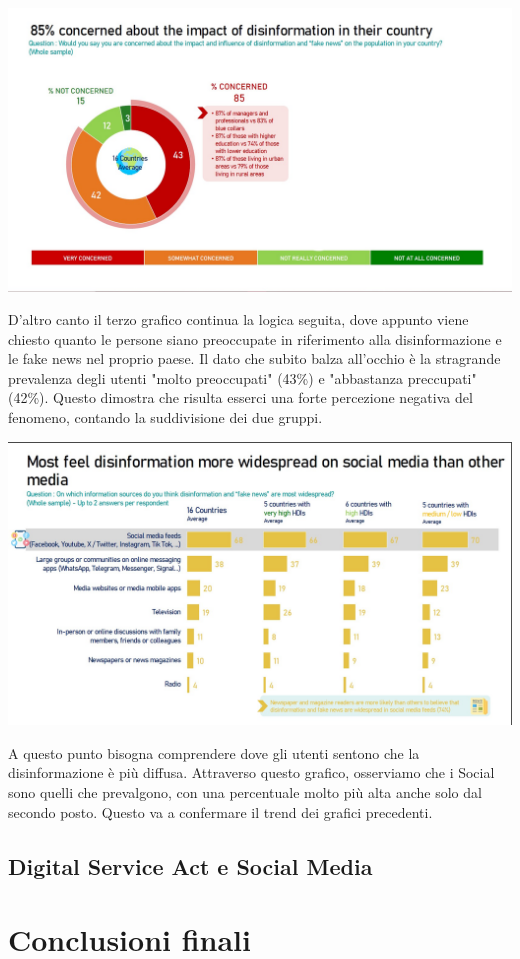 \documentclass{article}
\begin{document}
\begin{justify}
\begin{center}
\includegraphics[width=0.5\linewidth]{Immagini/Grafico3.jpg}
\end{center}

    D'altro canto il terzo grafico continua la logica seguita, dove appunto viene chiesto quanto le persone siano preoccupate in riferimento alla disinformazione e le fake news nel proprio paese.
    Il dato che subito balza all'occhio è la stragrande prevalenza degli utenti "molto preoccupati" (43\%) e "abbastanza preccupati" (42\%). Questo dimostra che risulta esserci una forte percezione negativa del fenomeno, contando la suddivisione dei due gruppi.
    \end{justify}
    
\begin{center}
\includegraphics[width=0.5\linewidth]{Immagini/Grafico4.jpg}
\end{center}

\begin{justify}
    A questo punto bisogna comprendere dove gli utenti sentono che la disinformazione è più diffusa. Attraverso questo grafico, osserviamo che i Social sono quelli che prevalgono, con una percentuale molto più alta anche solo dal secondo posto. Questo va a confermare il trend dei grafici precedenti.
\end{justify}

\centering\newpage\subsection{Digital Service Act e Social Media}
\begin{justify}
    
\end{justify}

\centering
\newpage\section{Conclusioni finali}

\newpage

\end{document}
